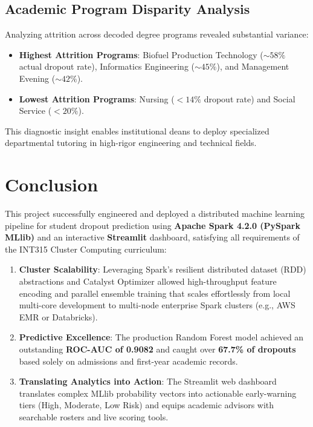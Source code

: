 \documentclass[11pt,a4paper]{article}
\begin{document}
\subsection{Academic Program Disparity Analysis}
Analyzing attrition across decoded degree programs revealed substantial variance:
\begin{itemize}
    \item \textbf{Highest Attrition Programs}: Biofuel Production Technology ($\sim 58\%$ actual dropout rate), Informatics Engineering ($\sim 45\%$), and Management Evening ($\sim 42\%$).
    \item \textbf{Lowest Attrition Programs}: Nursing ($<14\%$ dropout rate) and Social Service ($<20\%$).
\end{itemize}
This diagnostic insight enables institutional deans to deploy specialized departmental tutoring in high-rigor engineering and technical fields.

\section{Conclusion}
\label{sec:conclusion}

This project successfully engineered and deployed a distributed machine learning pipeline for student dropout prediction using \textbf{Apache Spark 4.2.0 (PySpark MLlib)} and an interactive \textbf{Streamlit} dashboard, satisfying all requirements of the INT315 Cluster Computing curriculum:

\begin{enumerate}
    \item \textbf{Cluster Scalability}: Leveraging Spark's resilient distributed dataset (RDD) abstractions and Catalyst Optimizer allowed high-throughput feature encoding and parallel ensemble training that scales effortlessly from local multi-core development to multi-node enterprise Spark clusters (e.g., AWS EMR or Databricks).
    \item \textbf{Predictive Excellence}: The production Random Forest model achieved an outstanding \textbf{ROC-AUC of 0.9082} and caught over \textbf{67.7\% of dropouts} based solely on admissions and first-year academic records.
    \item \textbf{Translating Analytics into Action}: The Streamlit web dashboard translates complex MLlib probability vectors into actionable early-warning tiers (High, Moderate, Low Risk) and equips academic advisors with searchable rosters and live scoring tools.
\end{enumerate}
\end{document}
